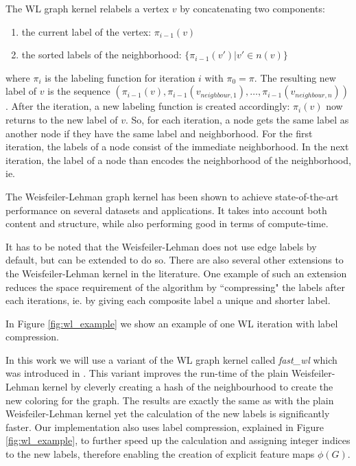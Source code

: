 The WL graph kernel relabels a vertex $v$ by concatenating two components:
\begin{enumerate}
    \item{the current label of the vertex: $\pi_{i-1}(v)$}
    \item{the sorted labels of the neighborhood: $\{ \pi_{i-1}(v') | v' \in n(v) \}$}
\end{enumerate}
where $\pi_{i}$ is the labeling function for iteration $i$ with $\pi_0 = \pi$.
The resulting new label of $v$ is the sequence $(\pi_{i-1}(v), \pi_{i-1}(v_{neighbour,1}), \dots , \pi_{i-1}(v_{neighbour,n}))$.
After the iteration, a new labeling function is created accordingly: $\pi_i(v)$ now returns to the new label of $v$.
So, for each iteration, a node gets the same label as another node if they have the same label and neighborhood.
For the first iteration, the labels of a node consist of the immediate neighborhood.
In the next iteration, the label of a node than encodes the neighborhood of the neighborhood, ie. 

The Weisfeiler-Lehman graph kernel has been shown to achieve state-of-the-art performance on several datasets and applications.
It takes into account both content and structure, while also performing good in terms of compute-time.


It has to be noted that the Weisfeiler-Lehman does not use edge labels by default, but can be extended to do so.
There are also several other extensions to the Weisfeiler-Lehman kernel in the literature.
One example of such an extension reduces the space requirement of the algorithm by ``compressing" the labels after each iterations, ie. by giving each composite label a unique and shorter label.

In Figure \ref{fig:wl_example} we show an example of one WL iteration with label compression.

In this work we will use a variant of the WL graph kernel called \textit{fast\_wl} which was introduced in \cite{Kersting2013}.
This variant improves the run-time of the plain Weisfeiler-Lehman kernel by cleverly creating a hash of the neighbourhood to create the new coloring for the graph.
The results are exactly the same as with the plain Weisfeiler-Lehman kernel yet the calculation of the new labels is significantly faster.
Our implementation also uses label compression, explained in Figure \ref{fig:wl_example}, to further speed up the calculation and assigning integer indices to the new labels, therefore enabling the creation of explicit feature maps $\phi(G)$.

